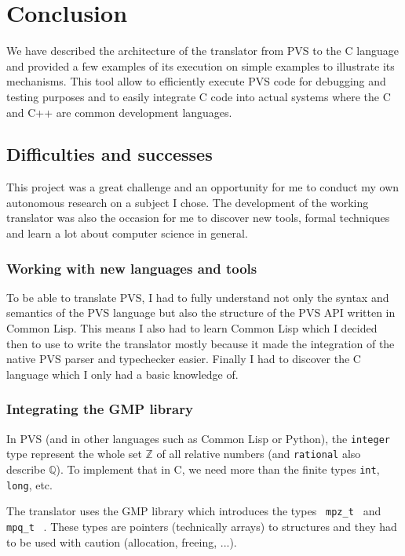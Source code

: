 \documentclass[12pt,a4paper]{article}
\newcommand{\cl}[1]{\texttt{#1}}
\newcommand{\Z}{\mathbb{Z}}
\newcommand{\Q}{\mathbb{Q}}
\newcommand{\mpzt}{ \texttt{ mpz\_t } }
\newcommand{\mpqt}{ \texttt{ mpq\_t } }
\begin{document}
\newpage
\section{Conclusion}

We have described the architecture of the translator from PVS to the C language and provided a few examples of its execution on simple examples to illustrate its mechanisms. This tool allow to efficiently execute PVS code for debugging and testing purposes and to easily integrate C code into actual systems where the C and C++ are common development languages.



\subsection{Difficulties and successes}

This project was a great challenge and an opportunity for me to conduct my own autonomous research on a subject I chose. The development of the working translator was also the occasion for me to discover new tools, formal techniques and learn a lot about computer science in general.


\subsubsection*{Working with new languages and tools}

To be able to translate PVS, I had to fully understand not only the syntax and semantics of the PVS language but also the structure of the PVS API written in Common Lisp. This means I also had to learn Common Lisp which I decided then to use to write the translator mostly because it made the integration of the native PVS parser and typechecker easier. Finally I had to discover the C language which I only had a basic knowledge of.


\subsubsection*{Integrating the GMP library}
In PVS (and in other languages such as Common Lisp or Python), the \cl{integer} type represent the whole set $\Z$ of all relative numbers (and \cl{rational} also describe $\Q$).
To implement that in C, we need more than the finite types \cl{int}, \cl{long}, etc.

The translator uses the GMP library which introduces the types \mpzt and \mpqt. These types are pointers (technically arrays) to structures and they had to be used with caution (allocation, freeing, ...).
\end{document}
